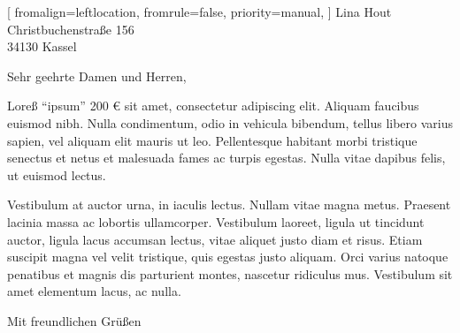 \documentclass[
	fontsize=12pt,
	parskip=half,
	paper=A4,
	frommobilephone=true,
    fromphone=false,
	fromfax=false,
	fromemail=true,
	fromurl=false,
	foldmarks=true,
    symbolicnames=fontawesome,
	version=last,
]{scrlttr2}
\begin{document}
\begin{letter}[
        fromalign=leftlocation, %
        fromrule=false,
        priority=manual, %
    ]{
        Lina Hout\\
        Christbuchenstraße 156\\
        34130 Kassel
    }

% 

\opening{Sehr geehrte Damen und Herren,}

Loreß "`ipsum"' 200 € sit amet, consectetur adipiscing elit. Aliquam faucibus euismod nibh. Nulla condimentum, odio in vehicula bibendum, tellus libero varius sapien, vel aliquam elit mauris ut leo. Pellentesque habitant morbi tristique senectus et netus et malesuada fames ac turpis egestas. Nulla vitae dapibus felis, ut euismod lectus.

Vestibulum at auctor urna, in iaculis lectus. Nullam vitae magna metus. Praesent lacinia massa ac lobortis ullamcorper. Vestibulum laoreet, ligula ut tincidunt auctor, ligula lacus accumsan lectus, vitae aliquet justo diam et risus. Etiam suscipit magna vel velit tristique, quis egestas justo aliquam. Orci varius natoque penatibus et magnis dis parturient montes, nascetur ridiculus mus. Vestibulum sit amet elementum lacus, ac nulla.


\closing{Mit freundlichen Grüßen}





\end{letter}


%
\end{document}
